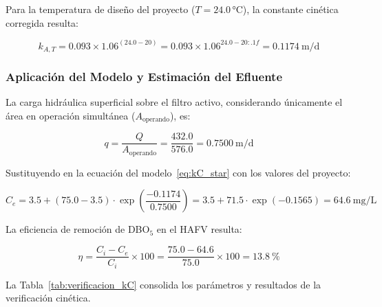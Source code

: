 Para la temperatura de diseño del proyecto ($T = 24.0$\,°C), la constante cinética corregida resulta:

\begin{equation}
k_{A,T} = 0.093 \times 1.06^{(24.0 - 20)} = 0.093 \times 1.06^{24.0 - 20:.1f} = 0.1174\ \text{m/d}
\end{equation}

\subsubsection*{Aplicación del Modelo y Estimación del Efluente}

La carga hidráulica superficial sobre el filtro activo, considerando únicamente el área en operación simultánea ($A_\text{operando}$), es:

\begin{equation}
q = \frac{Q}{A_\text{operando}} = \frac{432.0}{576.0} = 0.7500\ \text{m/d}
\end{equation}

Sustituyendo en la ecuación del modelo~\eqref{eq:kC_star} con los valores del proyecto:

\begin{equation}
C_e = 3.5 + (75.0 - 3.5) \cdot \exp\!\left(\frac{-0.1174}{0.7500}\right) = 3.5 + 71.5 \cdot \exp(-0.1565) = 64.6\ \text{mg/L}
\end{equation}

La eficiencia de remoción de DBO$_5$ en el HAFV resulta:

\begin{equation}
\eta = \frac{C_i - C_e}{C_i} \times 100 = \frac{75.0 - 64.6}{75.0} \times 100 = 13.8\ \%
\end{equation}

La Tabla~\ref{tab:verificacion_kC} consolida los parámetros y resultados de la verificación cinética.

